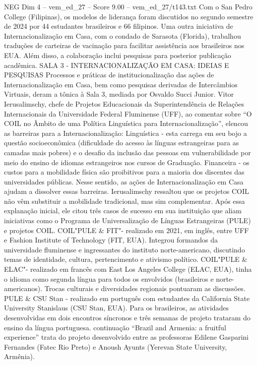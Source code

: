 \begin{textsample}{NEG Dim 4 – vem\_ed\_27 – Score 9.00 – vem\_ed\_27/t143.txt}
Com o San Pedro College (Filipinas), os modelos de liderança foram discutidos no segundo semestre de 2024 por 44 estudantes brasileiros e 66 filipinos.
Uma outra iniciativa de Internacionalização em Casa, com o condado de Sarasota (Florida), trabalhou traduções de carteiras de vacinação para facilitar assistência aos brasileiros nos EUA.
Além disso, a colaboração inclui pesquisas para posterior publicação acadêmica.
SALA 3 - INTERNACIONALIZAÇÃO EM CASA: IDEIAS E PESQUISAS Processos e práticas de institucionalização das ações de Internacionalização em Casa, bem como pesquisas derivadas de Intercâmbios Virtuais, deram a tônica à Sala 3, mediada por Osvaldo Succi Junior.
Vitor Ierusalimschy, chefe de Projetos Educacionais da Superintendência de Relações Internacionais da Universidade Federal Fluminense (UFF), ao comentar sobre “O COIL no Âmbito de uma Política Linguística para Internacionalização”, elencou as barreiras para a Internacionalização: Linguística - esta carrega em seu bojo a questão socioeconômica (dificuldade do acesso às línguas estrangeiras para as camadas mais pobres) e o desafio da inclusão das pessoas em vulnerabilidade por meio do ensino de idiomas estrangeiros nos cursos de Graduação.
Financeira - os custos para a mobilidade física são proibitivos para a maioria dos discentes das universidades públicas.
Nesse sentido, as ações de Internacionalização em Casa ajudam a dissolver essas barreiras.
Ierusalimschy ressaltou que os projetos COIL não vêm substituir a mobilidade tradicional, mas sim complementar.
Após essa explanação inicial, ele citou três casos de sucesso em sua instituição que aliam iniciativas como o Programa de Universalização de Línguas Estrangeiras (PULE) e projetos COIL.
COIL"PULE \& FIT"- realizado em 2021, em inglês, entre UFF e Fashion Institute of Technology (FIT, EUA).
Integrou formandos da universidade fluminense e ingressantes do instituto norte-americano, discutindo temas de identidade, cultura, pertencimento e ativismo político.
COIL"PULE \& ELAC"- realizado em francês com East Los Angeles College (ELAC, EUA), tinha o idioma como segunda língua para todos os envolvidos (brasileiros e norte-americanos).
Trocas culturais e diversidades regionais pontuaram as discussões.
PULE \& CSU Stan - realizado em português com estudantes da California State University Stanislaus (CSU Stan, EUA).
Para os brasileiros, as atividades desenvolvidas em dois encontros síncronos e três semanas de projeto trataram do ensino da língua portuguesa. continuação “Brazil and Armenia: a fruitful experience” trata do projeto desenvolvido entre as professoras Edilene Gasparini Fernandes (Fatec Rio Preto) e Anoush Ayunts (Yerevan State University, Armênia).

\end{textsample}
